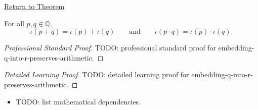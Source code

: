 \newpage
{}
\label{prf:embedding-q-into-r-preserves-arithmetic}

\begin{remark*}[Return]
\hyperref[thm:embedding-q-into-r-preserves-arithmetic]{Return to Theorem}
\end{remark*}

\begin{theorem*}
For all $p,q\in\mathbb{Q}$,
\[
\iota(p+q)=\iota(p)+\iota(q)
\qquad\text{and}\qquad
\iota(p\cdot q)=\iota(p)\cdot\iota(q).
\]
\end{theorem*}

\begin{proof}[Professional Standard Proof]
\LRAProofBodyStart
TODO: professional standard proof for embedding-q-into-r-preserves-arithmetic.
\end{proof}

\begin{proof}[Detailed Learning Proof]
\LRAProofBodyStart
TODO: detailed learning proof for embedding-q-into-r-preserves-arithmetic.
\end{proof}

\begin{remark*}
\end{remark*}

\begin{dependencies}
\begin{itemize}
  \item TODO: list mathematical dependencies.
\end{itemize}
\end{dependencies}

\clearpage
